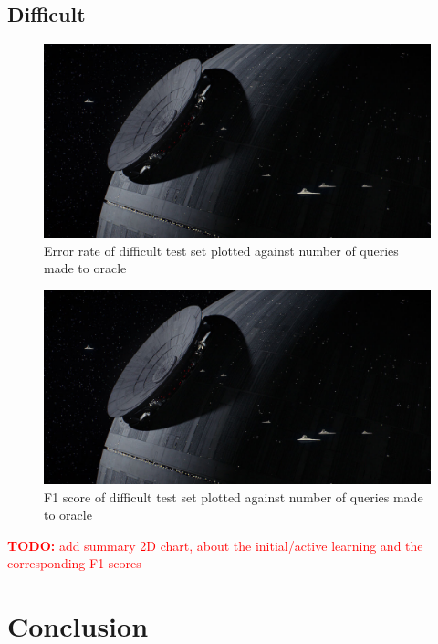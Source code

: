 \documentclass[paper=a4, fontsize=11pt]{scrartcl}
\numberwithin{equation}{section}    %
\numberwithin{figure}{section}      %
\numberwithin{table}{section}       %
\newcommand{\TODO}[1]{\textcolor{red}{\textbf{TODO: } #1}}
\numberwithin{equation}{section}    %
\numberwithin{figure}{section}      %
\numberwithin{table}{section}       %
\begin{document}
\subsection{Difficult}


\begin{figure}[!htb]
  \centering
  \includegraphics[scale = 0.35]{figures/fig.jpg}
      \caption{Error rate of difficult test set plotted against number of queries made to oracle}
      \label{harderror}
\end{figure}

\begin{figure}[!htb]
  \centering
  \includegraphics[scale = 0.35]{figures/fig.jpg}
      \caption{F1 score of difficult test set plotted against number of queries made to oracle}
      \label{hardf}
\end{figure}


\FloatBarrier

\TODO{add summary 2D chart, about the initial/active learning and the corresponding F1 scores}

\section{Conclusion}
\end{document}
